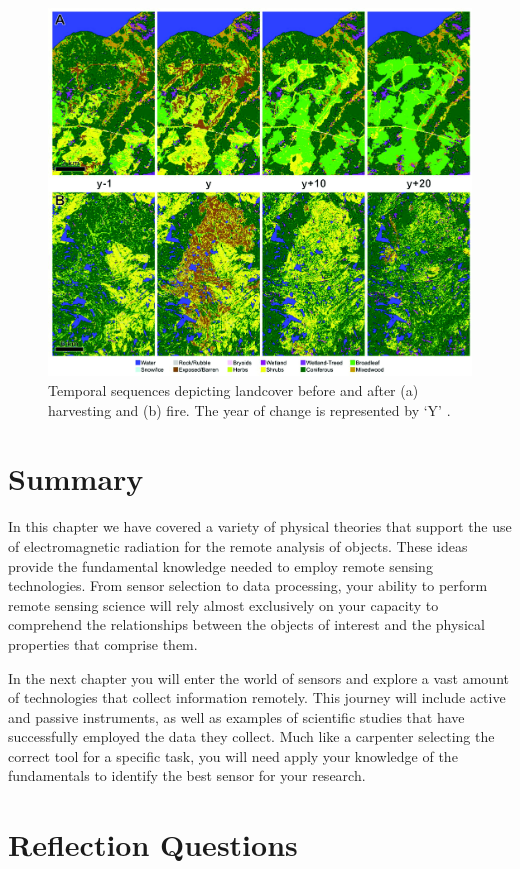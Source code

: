 \documentclass[
]{book}
\begin{document}
\begin{figure}
\includegraphics[width=0.75\linewidth]{images/11-hermo-disturbance} \caption{Temporal sequences depicting landcover before and after (a) harvesting and (b) fire. The year of change is represented by `Y' \citep{hermosilla_disturbance-informed_2018}.}\label{fig:11-hermo-disturb}
\end{figure}

\section{Summary}\label{summary-3}

In this chapter we have covered a variety of physical theories that support the use of electromagnetic radiation for the remote analysis of objects. These ideas provide the fundamental knowledge needed to employ remote sensing technologies. From sensor selection to data processing, your ability to perform remote sensing science will rely almost exclusively on your capacity to comprehend the relationships between the objects of interest and the physical properties that comprise them.

In the next chapter you will enter the world of sensors and explore a vast amount of technologies that collect information remotely. This journey will include active and passive instruments, as well as examples of scientific studies that have successfully employed the data they collect. Much like a carpenter selecting the correct tool for a specific task, you will need apply your knowledge of the fundamentals to identify the best sensor for your research.

\section{Reflection Questions}\label{reflection-questions-6}
\end{document}
